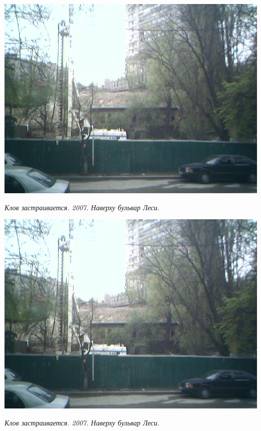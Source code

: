 \begin{center}
\includegraphics[width=0.93\linewidth]{rpix/25-04-07_1554.jpg}

\textit{Клов застраивается. 2007. Наверху бульвар Леси.}
\end{center}

\newpage


\begin{center}
\includegraphics[width=0.93\linewidth]{rpix/25-04-07_1554.jpg}

\textit{Клов застраивается. 2007. Наверху бульвар Леси.}
\end{center}

